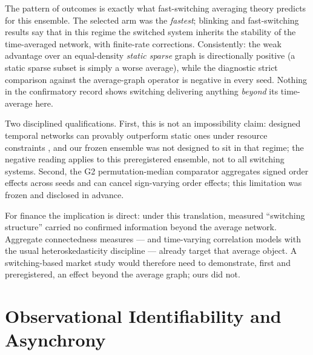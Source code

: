 \documentclass[11pt]{article}
\begin{document}
The pattern of outcomes is exactly what fast-switching averaging theory
predicts for this ensemble. The selected arm was the \emph{fastest}; blinking
and fast-switching results
\citep{belykh2004blinking,stilwell2006sufficient,hasler2013dynamics} say that
in this regime the switched system inherits the stability of the
time-averaged network, with finite-rate corrections. Consistently: the weak
advantage over an equal-density \emph{static sparse} graph is directionally
positive (a static sparse subset is simply a worse average), while the
diagnostic strict comparison against the average-graph operator is negative in
every seed. Nothing in the confirmatory record shows switching delivering
anything \emph{beyond} its time-average here.

Two disciplined qualifications. First, this is not an impossibility claim:
designed temporal networks can provably outperform static ones under resource
constraints \citep{zhang2021designing}, and our frozen ensemble was not
designed to sit in that regime; the negative reading applies to this
preregistered ensemble, not to all switching systems. Second, the G2
permutation-median comparator aggregates signed order effects across seeds and
can cancel sign-varying order effects; this limitation was frozen and
disclosed in advance.

For finance the implication is direct: under this translation, measured
``switching structure'' carried no confirmed information beyond the average
network. Aggregate connectedness measures
\citep{diebold2009measuring,diebold2014network,billio2012econometric} --- and
time-varying correlation models \citep{engle2002dynamic} with the usual
heteroskedasticity discipline \citep{forbes2002no} --- already target that
average object. A switching-based market study would therefore need to
demonstrate, first and preregistered, an effect beyond the average graph;
ours did not.

\section{Observational Identifiability and Asynchrony}
\label{sec:identifiability}
\end{document}
